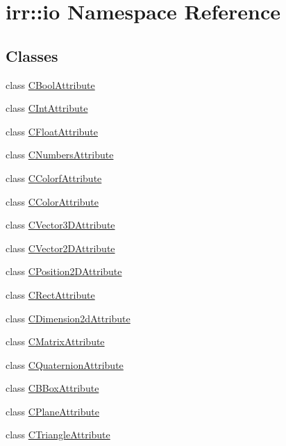\hypertarget{namespaceirr_1_1io}{\section{irr\-:\-:io Namespace Reference}
\label{namespaceirr_1_1io}
}
\subsection*{Classes}
\begin{DoxyCompactItemize}
\item 
class \hyperlink{classirr_1_1io_1_1_c_bool_attribute}{C\-Bool\-Attribute}
\item 
class \hyperlink{classirr_1_1io_1_1_c_int_attribute}{C\-Int\-Attribute}
\item 
class \hyperlink{classirr_1_1io_1_1_c_float_attribute}{C\-Float\-Attribute}
\item 
class \hyperlink{classirr_1_1io_1_1_c_numbers_attribute}{C\-Numbers\-Attribute}
\item 
class \hyperlink{classirr_1_1io_1_1_c_colorf_attribute}{C\-Colorf\-Attribute}
\item 
class \hyperlink{classirr_1_1io_1_1_c_color_attribute}{C\-Color\-Attribute}
\item 
class \hyperlink{classirr_1_1io_1_1_c_vector3_d_attribute}{C\-Vector3\-D\-Attribute}
\item 
class \hyperlink{classirr_1_1io_1_1_c_vector2_d_attribute}{C\-Vector2\-D\-Attribute}
\item 
class \hyperlink{classirr_1_1io_1_1_c_position2_d_attribute}{C\-Position2\-D\-Attribute}
\item 
class \hyperlink{classirr_1_1io_1_1_c_rect_attribute}{C\-Rect\-Attribute}
\item 
class \hyperlink{classirr_1_1io_1_1_c_dimension2d_attribute}{C\-Dimension2d\-Attribute}
\item 
class \hyperlink{classirr_1_1io_1_1_c_matrix_attribute}{C\-Matrix\-Attribute}
\item 
class \hyperlink{classirr_1_1io_1_1_c_quaternion_attribute}{C\-Quaternion\-Attribute}
\item 
class \hyperlink{classirr_1_1io_1_1_c_b_box_attribute}{C\-B\-Box\-Attribute}
\item 
class \hyperlink{classirr_1_1io_1_1_c_plane_attribute}{C\-Plane\-Attribute}
\item 
class \hyperlink{classirr_1_1io_1_1_c_triangle_attribute}{C\-Triangle\-Attribute}
\item 

\end{DoxyCompactItemize}

